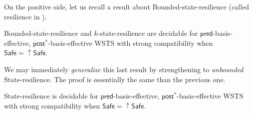 \documentclass[runningheads]{llncs}
\newcommand{\pred}{\textsf{pred}}
\newcommand{\post}{\textsf{post}}
\newcommand{\Safe}{\textsf{Safe}}
\begin{document}

On the positive side, let us recall a result about {\sc Bounded-state-resilience} (called resilience in \cite{DBLP:conf/gg/Ozkan22,DBLP:journals/corr/abs-2108-00889}).
%
%
\begin{theorem}\label{ref ozkan}
{\sc Bounded-state-resilience} and {\sc $k$-state-resilience} are decidable for $\pred$-basis-effective, $\post^*$-basis-effective WSTS with strong compatibility
when
$\Safe=\mathop{\uparrow} \Safe$.
\end{theorem}

We may immediately  \emph{generalize} this last result by strengthening to \emph{unbounded} {\sc State-resilience}. The proof is essentially the same than the previous one.

\begin{proposition}\label{postcomputable}
{\sc State-resilience} is decidable for $\pred$-basis-effective, $\post^*$-basis-effective WSTS with strong compatibility
when
$\Safe=\mathop{\uparrow} \Safe$.
\end{proposition}
\end{document}
